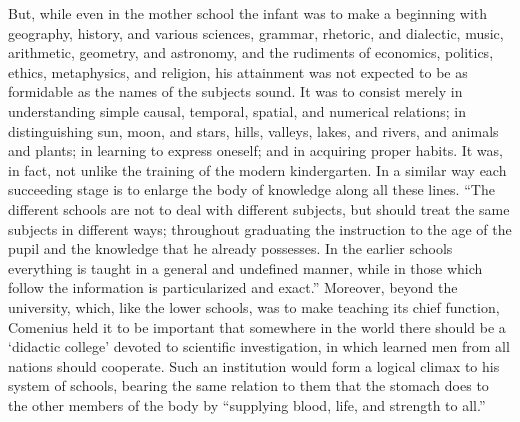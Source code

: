 \documentclass[
]{book}
\begin{document}
But, while even in the mother school the infant was to make a beginning with geography, history, and various sciences, grammar, rhetoric, and dialectic, music, arithmetic, geometry, and astronomy, and the rudiments of economics, politics, ethics, metaphysics, and religion, his attainment was not expected to be as formidable as the names of the subjects sound. It was to consist merely in understanding simple causal, temporal, spatial, and numerical relations; in distinguishing sun, moon, and stars, hills, valleys, lakes, and rivers, and animals and plants; in learning to express oneself; and in acquiring proper habits. It was, in fact, not unlike the training of the modern kindergarten. In a similar way each succeeding stage is to enlarge the body of knowledge along all these lines. ``The different schools are not to deal with different subjects, but should treat the same subjects in different ways; throughout graduating the instruction to the age of the pupil and the knowledge that he already possesses. In the earlier schools everything is taught in a general and undefined manner, while in those which follow the information is particularized and exact.'' Moreover, beyond the university, which, like the lower schools, was to make teaching its chief function, Comenius held it to be important that somewhere in the world there should be a `didactic college' devoted to scientific investigation, in which learned men from all nations should cooperate. Such an institution would form a logical climax to his system of schools, bearing the same relation to them that the stomach does to the other members of the body by ``supplying blood, life, and strength to all.''
\end{document}
